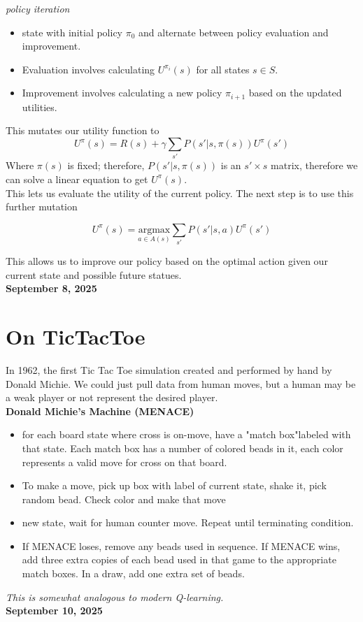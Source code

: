 \documentclass[10pt]{article}
\newcommand{\1}{\mathbb{1}}
\begin{document}
\textit{policy iteration}
\begin{itemize}
    \item state with initial policy $\pi_0$ and alternate between policy evaluation and improvement. 
    \item Evaluation involves calculating $U^{\pi_i}(s)$ for all states $s \in S$. 
    \item Improvement involves calculating a new policy $\pi_{i + 1}$ based on the updated utilities.
\end{itemize}
This mutates our utility function to
\[U^{\pi}(s) = R(s) + \gamma \sum_{s'} P(s' | s,\pi(s)) U^{\pi}(s')\]
Where $\pi(s)$ is fixed; therefore, $P(s' | s, \pi(s))$ is an $s' \times s$ matrix, therefore we can solve a linear equation to get $U^{\pi}(s)$.\\

This lets us evaluate the utility of the current policy. The next step is to use this further mutation


\[U^{\pi}(s) = \underset{a \in A(s)}{\text{argmax}}\sum_{s'} P(s' | s,a) U^{\pi}(s')\]

This allows us to improve our policy based on the optimal action given our current state and possible future statues.\\

\textbf{September 8, 2025}\\

\section{On TicTacToe}

In 1962, the first Tic Tac Toe simulation created and performed by hand by Donald Michie. We could just pull data from human moves, but a human may be a weak player or not represent the desired player.\\

\textbf{Donald Michie's Machine (MENACE)}
\begin{itemize}
    \item for each board state where cross is on-move, have a "match box"labeled with that state. Each match box has a number of colored beads in it, each color represents a valid move for cross on that board.
    \item To make a move, pick up box with label of current state, shake it, pick random bead. Check color and make that move
    \item new state, wait for human counter move. Repeat until terminating condition.
    \item If MENACE loses, remove any beads used in sequence. If MENACE wins, add three extra copies of each bead used in that game to the appropriate match boxes. In a draw, add one extra set of beads.
\end{itemize}

\textit{This is somewhat analogous to modern Q-learning.}\\


\textbf{September 10, 2025}\\



\noindent \underline{\hspace{3in}}\\
\end{document}
